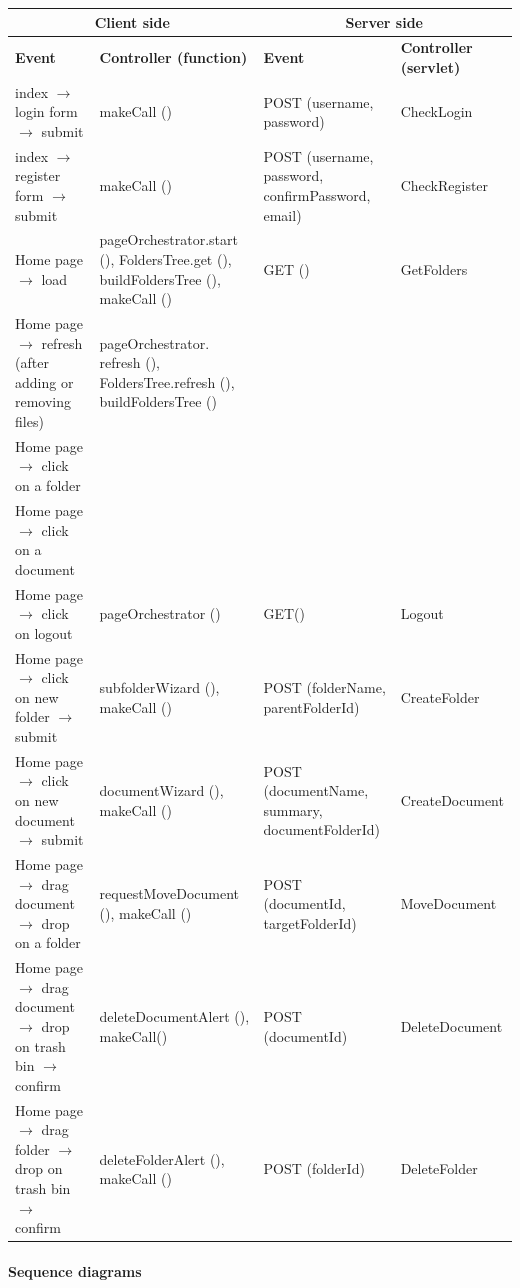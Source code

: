 \documentclass[a4paper,12pt]{article}
\begin{document}
\begin{center}
\begin{tabular}{|p{4cm}|p{4cm}|p{4cm}|p{4cm}|}
\hline

\multicolumn{2}{|c|}{\textbf{Client side}} & \multicolumn{2}{c|}{\textbf{Server side}}\\
\hline
\textbf{Event} & \textbf{Controller (function)} & \textbf{Event} & \textbf{Controller (servlet)} \\
\hline
index $\rightarrow$ login form $\rightarrow$ submit & makeCall () & POST (username, password) & CheckLogin\\
\hline
index $\rightarrow$ register form $\rightarrow$ submit & makeCall () & POST (username, password, confirmPassword, email) & CheckRegister\\
\hline
Home page $\rightarrow$ load & pageOrchestrator.start (), FoldersTree.get (), buildFoldersTree (), makeCall () & GET () & GetFolders\\
\hline
Home page $\rightarrow$ refresh (after adding or removing files) & pageOrchestrator. refresh (), FoldersTree.refresh (), buildFoldersTree () & &\\
\hline
Home page $\rightarrow$ click on a folder & & &\\ 
\hline
Home page $\rightarrow$ click on a document & & &\\
\hline
Home page $\rightarrow$  click on logout & pageOrchestrator () & GET() & Logout\\
\hline
Home page $\rightarrow$ click on new folder $\rightarrow$ submit & subfolderWizard (), makeCall () & POST (folderName, parentFolderId) & CreateFolder\\
\hline
Home page $\rightarrow$ click on new document $\rightarrow$ submit & documentWizard (), makeCall () & POST (documentName, summary, documentFolderId) & CreateDocument\\
\hline
Home page $\rightarrow$ drag document $\rightarrow$ drop on a folder & requestMoveDocument (), makeCall () & POST (documentId, targetFolderId) & MoveDocument\\
\hline
Home page $\rightarrow$ drag document $\rightarrow$ drop on trash bin $\rightarrow$ confirm & deleteDocumentAlert (), makeCall() & POST (documentId) & DeleteDocument\\
\hline
Home page $\rightarrow$ drag folder $\rightarrow$ drop on trash bin $\rightarrow$ confirm & deleteFolderAlert (), makeCall () & POST (folderId) & DeleteFolder\\
\hline

\end{tabular}
\end{center}
\newpage
\paragraph{Sequence diagrams}
\end{document}
